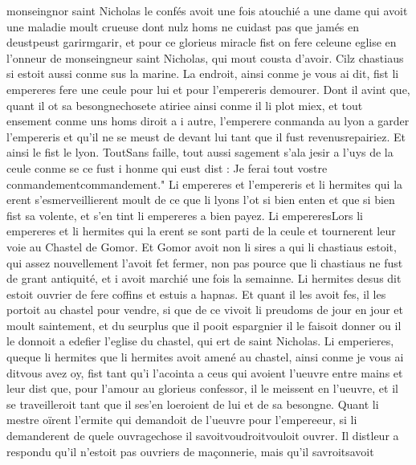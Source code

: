 \documentclass{article}
\begin{document}
\begin{pages}
     monseingnor saint Nicholas le confés avoit une fois 
      atouchié a une dame qui avoit une maladie moult crueuse dont nulz homs ne cuidast pas que jamés 
      en deustpeust 
      garirmgarir, 
   et pour ce glorieus miracle fist on fere 
   celeune eglise 
   en l’onneur de monseingneur saint Nicholas, qui mout cousta d’avoir.
   Cilz chastiaus si estoit aussi conme sus la marine. La endroit, 
   ainsi conme je vous ai dit, fist li empereres fere une
   ceule pour lui et pour l’empereris demourer. 
   Dont il avint que, quant il ot sa besongnechosete atiriee ainsi 
   conme il li plot miex, et tout ensement conme uns homs diroit a i autre, l’emperere
   conmanda au lyon a garder l’empereris
   et qu’il ne se meust de devant lui tant que il fust 
      revenusrepairiez.
   Et ainsi le fist le lyon. 
   ToutSans faille, tout aussi sagement s’ala jesir a l’uys de 
   la ceule conme se ce fust i honme qui eust dist : 
   Je ferai tout vostre 
      conmandementcommandement." Li empereres et l'empereris et li hermites 
         qui la erent s'esmerveillierent moult de ce que 
      li lyons l'ot si bien enten et que si bien fist sa volente, et s'en tint li empereres a bien payez. \pend
\pstart Li 
   empereresLors li empereres et li hermites 
   qui la erent 
   se sont parti de la ceule et tournerent leur voie 
   au Chastel de Gomor. 
   Et Gomor avoit non li sires a qui 
   li chastiaus estoit, 
   qui assez nouvellement l’avoit fet fermer, non pas pource que li chastiaus 
   ne fust de grant antiquité, et i avoit marchié une fois la semainne. 
   Li hermites desus dit estoit ouvrier de fere 
   coffins et estuis a hapnas. Et quant il les avoit fes, 
   il les portoit au chastel pour vendre, 
   si que de ce vivoit li preudoms de jour en jour et moult saintement, et du seurplus 
   que il pooit espargnier 
   il le faisoit donner ou  
   il le donnoit a edefier 
   l’eglise du chastel, qui ert de 
      saint Nicholas. 
   Li emperieres, 
   queque li hermites que 
   li hermites avoit amené au chastel, 
   ainsi conme je vous ai ditvous avez oy, 
   fist tant qu’i l’acointa a ceus qui avoient l’ueuvre entre mains  et leur dist que, 
   pour l’amour au glorieus confessor, il le meissent en l’ueuvre, et il se traveilleroit tant que 
      il ses'en loeroient 
      de lui et de sa besongne. \pend
\pstart Quant li mestre oïrent l’ermite 
   qui demandoit de l’ueuvre pour l’empereeur, 
   si li demanderent de quele 
      ouvragechose il 
      savoitvoudroitvouloit ouvrer. 
   Il distleur a respondu qu'il n'estoit pas ouvriers de maçonnerie, mais 
   qu’il savroitsavoit 

\end{pages}
\end{document}
